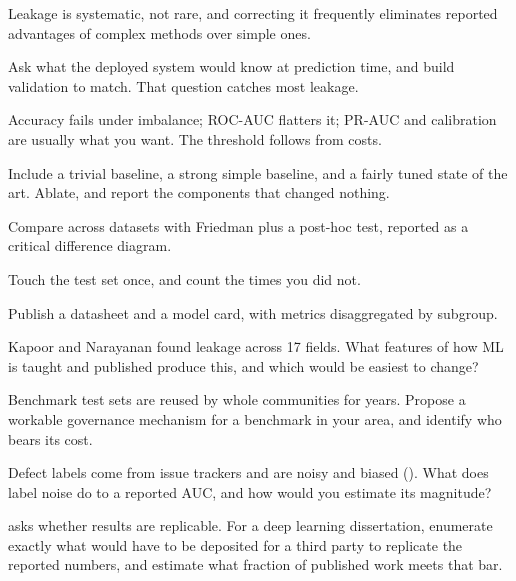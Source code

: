 \begin{chaptersummary}
\begin{tight}
  \item Leakage is systematic, not rare, and correcting it frequently
    eliminates reported advantages of complex methods over simple ones.
  \item Ask what the deployed system would know at prediction time, and build
    validation to match. That question catches most leakage.
  \item Accuracy fails under imbalance; ROC-AUC flatters it; PR-AUC and
    calibration are usually what you want. The threshold follows from costs.
  \item Include a trivial baseline, a strong simple baseline, and a fairly
    tuned state of the art. Ablate, and report the components that changed
    nothing.
  \item Compare across datasets with Friedman plus a post-hoc test, reported as
    a critical difference diagram.
  \item Touch the test set once, and count the times you did not.
  \item Publish a datasheet and a model card, with metrics disaggregated by
    subgroup.
\end{tight}
\end{chaptersummary}

\begin{reviewq}
  \item Kapoor and Narayanan found leakage across 17 fields. What features of
    how ML is taught and published produce this, and which would be easiest to
    change?
  \item Benchmark test sets are reused by whole communities for years. Propose a
    workable governance mechanism for a benchmark in your area, and identify
    who bears its cost.
  \item Defect labels come from issue trackers and are noisy and biased
    (). What does label noise do to a reported AUC, and how
    would you estimate its magnitude?
  \item {} asks whether results are replicable. For
    a deep learning dissertation, enumerate exactly what would have to be
    deposited for a third party to replicate the reported numbers, and estimate
    what fraction of published work meets that bar.
\end{reviewq}
